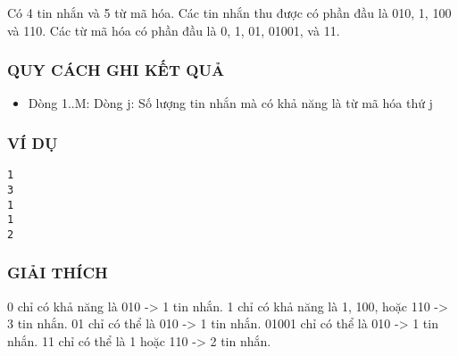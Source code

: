    Có 4 tin nhắn và 5 từ mã hóa. Các tin nhắn thu được có phần đầu là 010, 1, 100 và 110. Các từ mã hóa có phần đầu là 0, 1, 01, 01001, và 11.  

\subsubsection{   QUY CÁCH GHI KẾT QUẢ  }
\begin{itemize}
	\item     Dòng 1..M: Dòng j: Số lượng tin nhắn mà có khả năng là từ mã hóa thứ j   
\end{itemize}

\subsubsection{   VÍ DỤ  }
\begin{verbatim}
1
3
1
1
2
\end{verbatim}

\subsubsection{   GIẢI THÍCH  }

   0 chỉ có khả năng là 010 -> 1 tin nhắn. 1 chỉ có khả năng là 1, 100, hoặc 110 -> 3 tin nhắn. 01 chỉ có thể là 010 -> 1 tin nhắn. 01001 chỉ có thể là 010 -> 1 tin nhắn. 11 chỉ có thể là 1 hoặc 110 -> 2 tin nhắn.  
